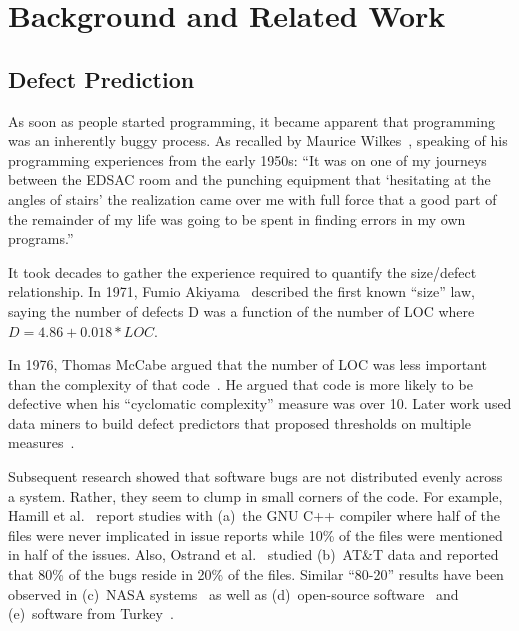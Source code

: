 \documentclass[sigconf]{acmart}
\theoremstyle{break}
\begin{document}
\section{Background and Related Work}\label{background}

\subsection{Defect Prediction}


As soon as people started programming, it became apparent
that programming was an inherently buggy process. As recalled
by Maurice Wilkes~\cite{wilkes1985memoirs}, speaking of his programming experiences from the early 1950s: ``It was on one of my journeys between the EDSAC room and the punching equipment that `hesitating at the angles of stairs' the realization came over me with full force that a good part of the remainder of my life was going to be spent in finding errors in my own programs.''

It took  decades to gather the experience required to quantify the size/defect relationship. In 1971, Fumio Akiyama~\cite{akiyama1971example} described the first known ``size'' law, saying the number of defects
D was a function of the number of LOC where \mbox{$D=4.86+0.018*\mathit{LOC}$}.

In 1976, Thomas McCabe argued that the number of LOC was less important than the complexity of that code~\cite{mccabe1976complexity}. He argued
that code is more likely to be defective when his ``cyclomatic complexity'' measure was over 10. Later work used data miners to build defect predictors
that proposed thresholds on multiple measures~\cite{menzies2007data}. 

Subsequent research showed 
that software bugs are not distributed evenly across
a system. Rather, they seem to clump in small corners of the code. For example,
Hamill et al.~\cite{hamill09} report studies with (a)~the GNU C++ compiler
where half of the files were never implicated in issue reports while 10\% of
the files were mentioned in half of the issues. Also,
Ostrand et al.~\cite{Ostrand:2004} studied
(b)~AT\&T data and reported that 80\% of the bugs reside in 20\% of the files.
Similar ``80-20'' results have been observed in (c)~NASA systems~\cite{hamill09} as well
as (d)~open-source software~\cite{koru2009investigation} and (e)~software
from Turkey~\cite{misirli2011ai}. 
\end{document}
